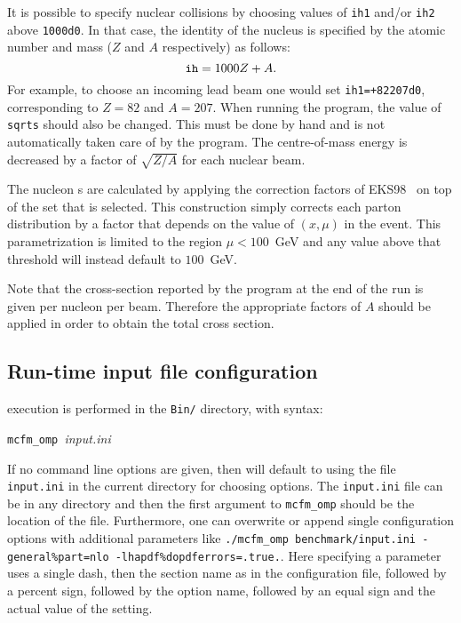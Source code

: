 It is possible to specify nuclear collisions by choosing values
of {\tt ih1} and/or {\tt ih2} above {\tt 1000d0}. In that case,
the identity of the nucleus is specified by the atomic number
and mass ($Z$ and $A$ respectively) as follows:
\begin{equation}
{\tt ih} = 1000Z+A.
\end{equation}
For example, to choose an incoming lead beam one would set
{\tt ih1=+82207d0}, corresponding to $Z=82$ and $A=207$.
When running the program, the value of {\tt sqrts} should also be
changed. This must be done by hand and is not automatically taken
care of by the
program. The centre-of-mass energy is decreased by a factor of
$\sqrt{Z/A}$ for each nuclear beam. 

The nucleon \PDF{}s are calculated by applying the correction
factors of EKS98~\cite{Eskola:1998df} on top of the \PDF{} set that is selected.
This construction simply corrects each parton distribution by
a factor that depends on the value of $(x,\mu)$ in the event.
This parametrization is limited to the region $\mu < 100$~GeV and
any value above that threshold will instead default to $100$~GeV.

Note that the cross-section reported by the program at the end
of the run is given per nucleon per beam. Therefore the
appropriate factors of $A$ should be applied in order to obtain
the total cross section.


\subsection{Run-time input file configuration}

\MCFM{} execution is performed in the {\tt Bin/} directory,
with syntax:
\begin{center}
	{\tt mcfm\_omp }{\it input.ini}
\end{center}
If no command line options are given, then \MCFM{} will default
to using the file {\tt input.ini} in the current directory for
choosing options. The \texttt{input.ini} file can be in any directory and
then the first argument to \texttt{mcfm\_omp} should be the location
of the file. Furthermore, one can overwrite or append single
configuration options with additional parameters like 
\texttt{./mcfm\_omp benchmark/input.ini -general\%part=nlo -lhapdf\%dopdferrors=.true.}.
Here specifying a parameter uses a single dash, then the section name as in the configuration file, followed
by a percent sign, followed by the option name, followed by an equal sign and the actual value of the setting.

